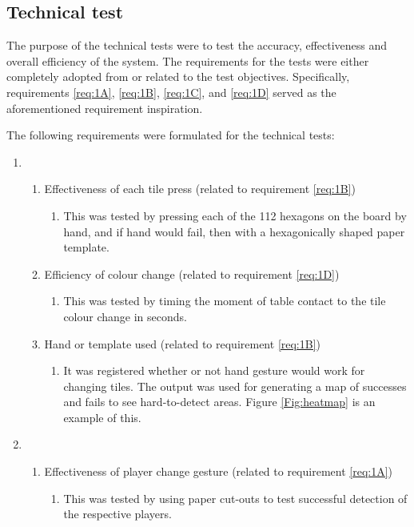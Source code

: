 \subsection{Technical test}
The purpose of the technical tests were to test the accuracy, effectiveness and overall efficiency of the system. The requirements for the tests were either completely adopted from or related to the test objectives. Specifically, requirements \ref{req:1A}, \ref{req:1B}, \ref{req:1C}, and \ref{req:1D} served as the aforementioned requirement inspiration.

The following requirements were formulated for the technical tests:
\begin{enumerate}
	\item \begin{enumerate}
		\item Effectiveness of each tile press (related to requirement 			\ref{req:1B})
			\begin{enumerate}
				\item This was tested by pressing each of the 112 hexagons on the board by hand, and if hand would fail, then with a hexagonically shaped paper template.
			\end{enumerate}
		\item Efficiency of colour change (related to requirement \ref{req:1D})
		\begin{enumerate}
				\item This was tested by timing the moment of table contact to the tile colour change in seconds.
		\end{enumerate}
		\item Hand or template used (related to requirement \ref{req:1B})
		\begin{enumerate}
				\item It was registered whether or not hand gesture would work for changing tiles. The output was used for generating a map of successes and fails to see hard-to-detect areas. Figure \ref{Fig:heatmap} is an example of this.
		\end{enumerate}
	\end{enumerate}
	\item \begin{enumerate}
		\item Effectiveness of player change gesture (related to requirement \ref{req:1A})
		\begin{enumerate}
				\item This was tested by using paper cut-outs to test successful detection of the respective players.

\end{enumerate}
\end{enumerate}
\end{enumerate}
